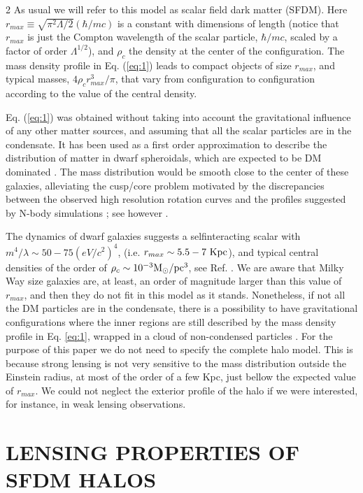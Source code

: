 \documentclass {article}
\begin{document}
\begin {multicols} {2}
As usual we will refer to this model as scalar field dark matter (SFDM). Here $ r_{max} \equiv \sqrt{\pi^2 \Lambda / 2} (\hbar / mc) $ is a constant with dimensions of length (notice that $r_{max}$ is just the Compton wavelength of the scalar particle, $ \hbar / mc $, scaled by a factor of order $ \Lambda^{1/2} $), and $\rho_c$ the density at the center of the configuration. The mass density profile in Eq. (\ref {eq:1}) leads to compact objects of size $ r_{max} $, and typical masses, $ 4\rho_c r_{max}^3 / \pi $, that vary from configuration to configuration according to the value of the central density.


Eq. (\ref {eq:1}) was obtained without taking into account the gravitational influence of any other matter sources, and assuming that all the scalar particles are in the condensate. It has been used as a first order approximation to describe the distribution of matter in dwarf spheroidals, which are expected to be DM dominated \cite {Arbey_2003, Lora_2012, Robles_2012}. The mass distribution would be smooth close to the center of these galaxies, alleviating the cusp/core problem motivated by the discrepancies between the observed high resolution rotation curves and the profiles suggested by N-body simulations \cite {de_Blok_2002}; see however \cite {Valenzuela_2007}.


The dynamics of dwarf galaxies suggests a selfinteracting scalar with $ m^4 / \lambda \sim 50 - 75 (eV/c^2)^4 $, (i.e. $ r_{max} \sim 5.5 - 7 \ \textup{Kpc} $), and typical central densities of the order of $ \rho_c \sim 10^{-3} \textup{M}_\odot / \textup {pc}^3 $, see Ref. \cite {Arbey_2003}. We are aware that Milky Way size galaxies are, at least, an order of magnitude larger than this value of $r_{max}$, and then they do not fit in this model as it stands. Nonetheless, if not all the DM particles are in the condensate, there is a possibility to have gravitational configurations where the inner regions are still described by the mass density profile in Eq. \ref{eq:1}, wrapped in a cloud of non-condensed particles \cite {Harko_2012}. For the purpose of this paper we do not need to specify the complete halo model. This is because strong lensing is not very sensitive to the mass distribution outside the Einstein radius, at most of the order of a few Kpc, just bellow the expected value of $r_{max}$. We could not neglect the exterior profile of the halo if we were interested, for instance, in weak lensing observations.


\section {\normalsize {LENSING PROPERTIES OF SFDM HALOS}}



\end{multicols}
\end{document}
